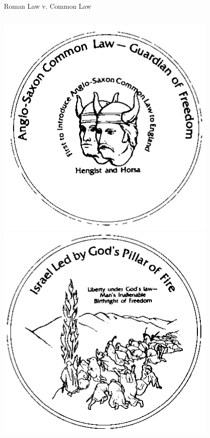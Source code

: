 \begin{frame}{Roman Law v. Common Law}
\begin{columns}[onlytextwidth]
            \centering
            \includegraphics[height=0.35\textheight]{img/hh-coin.png} \\
            \includegraphics[height=0.35\textheight]{img/israel-coin.png} \\
    \end{columns}
\end{frame}

